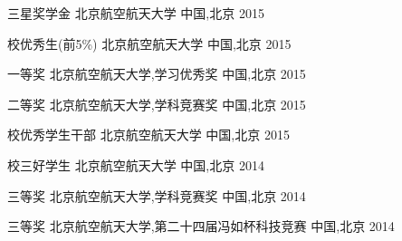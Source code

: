 \begin{cvhonors}


\cvhonor
{三星奖学金} %
{北京航空航天大学} %
{中国,北京} %
{2015} %


\cvhonor
{校优秀生(前5\%)} %
{北京航空航天大学} %
{中国,北京} %
{2015} %


\cvhonor
{一等奖} %
{北京航空航天大学,学习优秀奖}%
{中国,北京} %
{2015} %


\cvhonor
{二等奖} %
{北京航空航天大学,学科竞赛奖} %
{中国,北京} %
{2015} %


\cvhonor
{校优秀学生干部} %
{北京航空航天大学} %
{中国,北京} %
{2015} %


\cvhonor
{校三好学生} %
{北京航空航天大学} %
{中国,北京} %
{2014} %


\cvhonor
{三等奖}
{北京航空航天大学,学科竞赛奖}
{中国,北京}
{2014}


\cvhonor
{三等奖} %
{北京航空航天大学,第二十四届冯如杯科技竞赛} %
{中国,北京} %
{2014} %


\end{cvhonors}